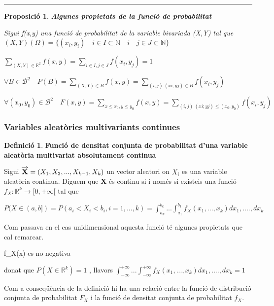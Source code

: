 \documentclass[
  catalan,
]{article}
\newtheorem{proposition}{Proposició}[section]
\theoremstyle{definition}
\newtheorem{definition}{Definició}[section]
\theoremstyle{definition}
\theoremstyle{definition}
\theoremstyle{definition}
\theoremstyle{remark}
\begin{document}
\begin{center}\rule{0.5\linewidth}{0.5pt}\end{center}

\begin{proposition}

\textbf{Algunes propietats de la funció de probabilitat}

Sigui f(x,y) una funció de probabilitat de la variable bivariada (X,Y) tal que \((X,Y)(\Omega)=\{ (x_i,y_i) \quad i \in I \subset \mathbb{N} \quad  i \quad  j \in J \subset \mathbb{N} \}\)

\(\sum_{(X,Y) \in \mathbb{R}^2} f(x,y)= \sum_{ i \in I, j \in J}f(x_i, y_j)=1\)

\(\forall B \in \mathcal{B}^2 \quad  P(B)=\sum_{(X,Y) \in B} f(x,y)=\sum_{(i,j) \ (xi;yj)\in B} f(x_i,y_j)\)

\(\forall (x_0,y_0) \in \mathcal{B}^2  \quad  F(x,y)= \sum_{ x \leq x_0, y \leq y_0} f(x,y)=\sum_{(i,j) \ (xi;yj) \leq (x_0,y_0)} f(x_i,y_j)\)

\end{proposition}

\subsubsection{Variables aleatòries multivariants continues}\label{variables-aleatuxf2ries-multivariants-continues}

\begin{definition}
\textbf{Funció de densitat conjunta de probabilitat d'una variable aleatòria multivariat absolutament continua}

Sigui \(\overrightarrow{\bf{X}}=(X_1,X_2,...,X_{k-1},X_k)\) un vector aleatori on \(X_i\) es una variable aleatòria continua. Diguem que \textbf{X} és continu si i només si existeis una funció \(f_X:   \mathbb{R}^k \rightarrow[0,+\infty[\) tal que

\(P(X \in (a,b])=P(a_i<X_i<b_i, i=1,...,k)= \int_{a_k}^{b_k}...\int_{a_1}^{b_1} f_X(x_1,...,x_k)dx_1,....,dx_k\)
\end{definition}

Com passava en el cas unidimensional aquesta funció té algunes propietats que cal remarcar.

f\_X(x) es no negativa

donat que \(P(X \in   \mathbb{R}^k)= 1\) , llavors
\(\int_{-\infty}^{+\infty}...\int_{-\infty}^{+\infty} f_X(x_1,...,x_k)dx_1,....,dx_k=1\)

Com a conseqüència de la definició hi ha una relació entre la funció de distribució conjunta de probabilitat \(F_X\) i la funció de densitat conjunta de probabilitat \(f_X\).
\end{document}
